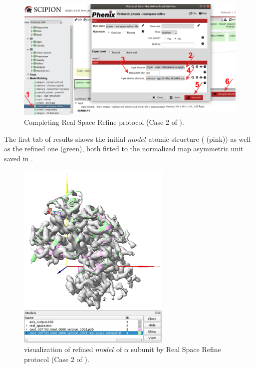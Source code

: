  \begin{figure}[H]
  \centering 
  \captionsetup{width=.9\linewidth} 
  \includegraphics[width=1\textwidth]{Images/Fig29}
  \caption{Completing \phenix Real Space Refine protocol (Case 2 of ).}
  \label{fig:phenix_real_space_refine_protocol}
  \end{figure}
 
 The first tab of results shows the initial $model$ atomic structure  ( (pink)) as well as the refined one (green), both fitted to the normalized map asymmetric unit saved in \coot. 
 
 \begin{figure}[H]
  \centering 
  \captionsetup{width=.9\linewidth} 
  \includegraphics[width=0.65\textwidth]{Images/Fig30}
  \caption{\chimera visualization of refined $model$ of  $\alpha$ subunit by \phenix Real Space Refine protocol (Case 2 of ).}
  \label{fig:phenix_real_space_refine_chimera}
  \end{figure}
  
